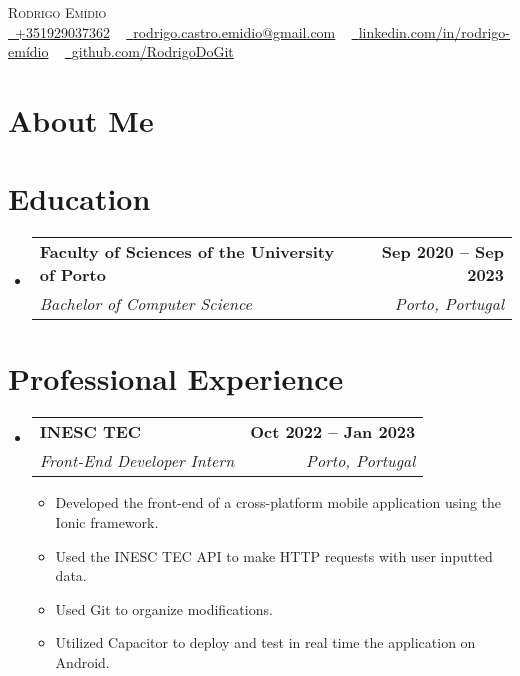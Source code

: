 \documentclass[letterpaper,11pt]{article}
\makeatletter
\newcommand{\resumeItem}[1]{
  \item\small{
    {#1 \vspace{-2pt}}
  }
}
\newcommand{\resumeSubheading}[4]{
  \vspace{-2pt}\item
    \begin{tabular*}{1.0\textwidth}[t]{l@{\extracolsep{\fill}}r}
      \textbf{#1} & \textbf{\small #2} \\
      \textit{\small#3} & \textit{\small #4} \\
    \end{tabular*}\vspace{-7pt}
}
\newcommand{\resumeSubHeadingListStart}{\begin{itemize}[leftmargin=0.0in, label={}]}
\newcommand{\resumeSubHeadingListEnd}{\end{itemize}}
\newcommand{\resumeItemListStart}{\begin{itemize}}
\newcommand{\resumeItemListEnd}{\end{itemize}\vspace{-5pt}}
\makeatother
\begin{document}

\begin{center}
    {\Huge \scshape Rodrigo Emídio} \\ \vspace{5pt}
    \small \href{tel:+351929037362}{\raisebox{-0.1\height}\faPhone\ {+351929037362}} ~ \href{mailto:rodrigo.castro.emidio@gmail.com}{\raisebox{-0.2\height}\faEnvelope\ {rodrigo.castro.emidio@gmail.com}} ~ 
    \href{https://www.linkedin.com/in/rodrigo-emídio/}{\raisebox{-0.2\height}\faLinkedin\ {linkedin.com/in/rodrigo-emídio}}  ~
    \href{https://github.com/RodrigoDoGit}{\raisebox{-0.2\height}\faGithub\ {github.com/RodrigoDoGit}}
    \vspace{-8pt}
\end{center}

\section{About Me}

\section{Education}
  \resumeSubHeadingListStart
    \resumeSubheading
      {Faculty of Sciences of the University of Porto}{Sep 2020 -- Sep 2023}
      {Bachelor of Computer Science}{Porto, Portugal}
  \resumeSubHeadingListEnd

\section{Professional Experience}
  \resumeSubHeadingListStart
    \resumeSubheading
      {INESC TEC}{Oct 2022 -- Jan 2023}
      {Front-End Developer Intern}{Porto, Portugal}
      \resumeItemListStart
        \resumeItem{Developed the front-end of a cross-platform mobile application using the Ionic framework.}
        \resumeItem{Used the INESC TEC API to make HTTP requests with user inputted data.}
        \resumeItem{Used Git to organize modifications.}
        \resumeItem{Utilized Capacitor to deploy and test in real time the application on Android.}
    \resumeItemListEnd
    \resumeSubHeadingListEnd
\vspace{-16pt}
\end{document}
